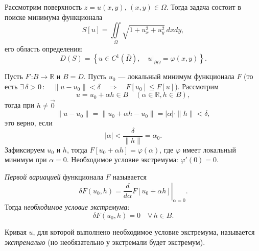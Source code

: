 \documentclass[12pt,a5paper]{book}
\begin{document}
\begin{itemize}
\begin{center}
		\end{center}
		Рассмотрим поверхность $z = u(x,y)$, $(x,y) \in \Omega$. Тогда задача состоит в поиске минимума функционала
		\begin{equation*}
			S[u] = \iint\limits_{\Omega}\sqrt{1 + u_x^2 + u_y^2}\,dxdy,
		\end{equation*}
		его область определения:
		\begin{equation*}
			D(S) = \left\{u \in C^1(\bar{\Omega}), \quad \left.u\right|_{\partial\Omega} = \varphi(x,y)\right\}.
		\end{equation*}		
	\end{itemize}

	Пусть $F$\,:$B \rightarrow \mathbb{R}$ и $B = D$. Пусть $u_0$ --- локальный минимум функционала $F$ (то есть $\exists\,\delta > 0\,: \quad \|u - u_0\| < \delta \quad \Rightarrow \quad F[u_0] \leq F[u]$). Рассмотрим
	\begin{equation*}
		u = u_0 + \alpha h \in B \quad \left(\alpha \in \mathbb{R}, h \in B\right),
	\end{equation*}
	тогда при $h \neq \vec{0}$
	\begin{equation*}
		\|u - u_0\| = \|u_0 + \alpha h - u_0\| = |\alpha| \cdot \|h\| < \delta,
	\end{equation*}
	это верно, если
	\begin{equation*}
		|\alpha| < \frac{\delta}{\|h\|} = \alpha_0.
	\end{equation*}
	Зафиксируем $u_0$ и $h$, тогда $F[u_0 + \alpha h] = \varphi(\alpha)$, где $\varphi$ имеет локальный минимум при $\alpha = 0$. Необходимое условие экстремума: $\varphi'(0) = 0$.
	
	\emph{Первой вариацией} функционала $F$ называется
	\begin{equation*}
		\delta F(u_0,h) = \left.\frac{d}{d\alpha}F[u_0 + \alpha h]\right|_{\alpha = 0}.
	\end{equation*}
	Тогда \emph{необходимое условие экстремума}:
	\begin{equation*}
		\delta F(u_0,h) = 0 \quad \forall\,h \in B.
	\end{equation*}
	
	Кривая $u$, для которой выполнено необходимое условие экстремума, называется \emph{экстремалью} (но необязательно у экстремали будет экстремум).
	
\end{document}
